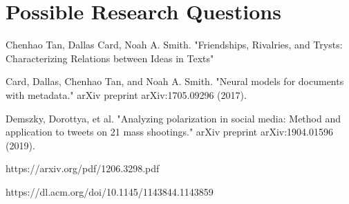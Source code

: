 \documentclass{article}
\begin{document}
\section{Possible Research Questions}







\begin{thebibliography}{999}

Chenhao Tan, Dallas Card, Noah A. Smith. "Friendships, Rivalries, and Trysts: Characterizing Relations between Ideas in Texts"

Card, Dallas, Chenhao Tan, and Noah A. Smith. "Neural models for documents with metadata." arXiv preprint arXiv:1705.09296 (2017).

Demszky, Dorottya, et al. "Analyzing polarization in social media: Method and application to tweets on 21 mass shootings." arXiv preprint arXiv:1904.01596 (2019).

https://arxiv.org/pdf/1206.3298.pdf

https://dl.acm.org/doi/10.1145/1143844.1143859
 
\end{thebibliography}
\end{document}
